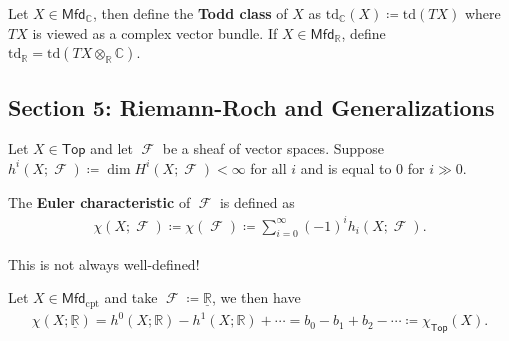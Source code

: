\begin{definition}

Let \(X \in {\mathsf{Mfd}}_{\mathbb{C}}\), then define the \textbf{Todd
class} of \(X\) as
\(\mathrm{td}_{\mathbb{C}}(X) \coloneqq\mathrm{td}(TX)\) where \(TX\) is
viewed as a complex vector bundle. If
\(X\in {\mathsf{Mfd}}_{\mathbb{R}}\), define
\(\mathrm{td}_{\mathbb{R}}= \mathrm{td}(TX \otimes_{\mathbb{R}}{\mathbb{C}})\).

\end{definition}

\hypertarget{section-5-riemann-roch-and-generalizations}{%
\subsection{Section 5: Riemann-Roch and
Generalizations}\label{section-5-riemann-roch-and-generalizations}}

\begin{remark}

Let \(X\in {\mathsf{Top}}\) and let \(\operatorname{\mathcal{F}}\) be a
sheaf of vector spaces. Suppose
\(h^i(X; \operatorname{\mathcal{F}}) \coloneqq\dim H^i(X; \operatorname{\mathcal{F}}) < \infty\)
for all \(i\) and is equal to 0 for \(i \gg 0\).

\end{remark}

\begin{definition}

The \textbf{Euler characteristic} of \(\operatorname{\mathcal{F}}\) is
defined as
\begin{align*}
\chi(X; \operatorname{\mathcal{F}}) \coloneqq\chi(\operatorname{\mathcal{F}}) \coloneqq\sum_{i=0}^{\infty } (-1)^i h_i(X; \operatorname{\mathcal{F}} )
.\end{align*}

\end{definition}

\begin{warnings}

This is not always well-defined!

\end{warnings}

\begin{example}[?]

Let \(X\in {\mathsf{Mfd}}_{\text{cpt}}\) and take
\(\operatorname{\mathcal{F}} \coloneqq\underline{{\mathbb{R}}}\), we
then have
\begin{align*}
\chi(X; \underline{{\mathbb{R}}}) = h^0(X; {\mathbb{R}}) - h^1(X; {\mathbb{R}}) + \cdots = b_0 - b_1 + b_2 - \cdots \coloneqq\chi_{{\mathsf{Top}}}(X)
.\end{align*}

\end{example}

